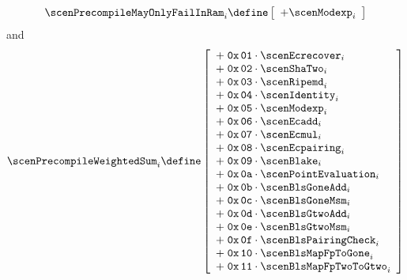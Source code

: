 \[
	\scenPrecompileMayOnlyFailInRam _{i}
	\define
	\left[ \begin{array}{l}
		+ \scenModexp             _{i} \\
	\end{array} \right]
\]
and
\[
	\scenPrecompileWeightedSum _{i}
	\define
	\left[ \begin{array}{l}
		+ \; \mathtt{0x\,01} \cdot \scenEcrecover         _{i} \\
		+ \; \mathtt{0x\,02} \cdot \scenShaTwo            _{i} \\
		+ \; \mathtt{0x\,03} \cdot \scenRipemd            _{i} \\
		+ \; \mathtt{0x\,04} \cdot \scenIdentity          _{i} \\
		+ \; \mathtt{0x\,05} \cdot \scenModexp            _{i} \\
		+ \; \mathtt{0x\,06} \cdot \scenEcadd             _{i} \\
		+ \; \mathtt{0x\,07} \cdot \scenEcmul             _{i} \\
		+ \; \mathtt{0x\,08} \cdot \scenEcpairing         _{i} \\
		+ \; \mathtt{0x\,09} \cdot \scenBlake             _{i} \\
		+ \; \mathtt{0x\,0a} \cdot \scenPointEvaluation   _{i} \\
		+ \; \mathtt{0x\,0b} \cdot \scenBlsGoneAdd        _{i} \\
		+ \; \mathtt{0x\,0c} \cdot \scenBlsGoneMsm        _{i} \\
		+ \; \mathtt{0x\,0d} \cdot \scenBlsGtwoAdd        _{i} \\
		+ \; \mathtt{0x\,0e} \cdot \scenBlsGtwoMsm        _{i} \\
		+ \; \mathtt{0x\,0f} \cdot \scenBlsPairingCheck   _{i} \\
		+ \; \mathtt{0x\,10} \cdot \scenBlsMapFpToGone    _{i} \\
		+ \; \mathtt{0x\,11} \cdot \scenBlsMapFpTwoToGtwo _{i} \\
	\end{array} \right]
\]
